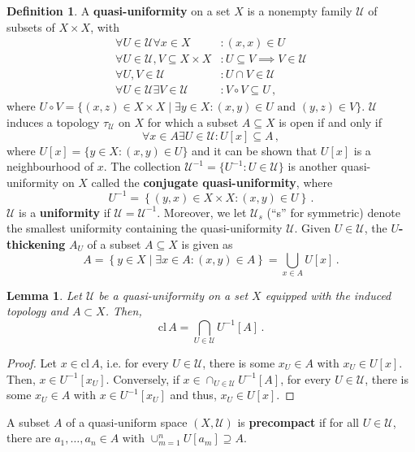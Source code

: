 \documentclass[
	paper=A4,
	pagesize=auto,
	fontsize=12pt
]{scrartcl}
\theoremstyle{plain}
\newtheorem{lemma}[theorem]{Lemma}
\theoremstyle{remark}
\theoremstyle{definition}
\newtheorem{definition}[theorem]{Definition}
\begin{document}
\begin{definition}
A \textbf{quasi-uniformity} on a set $X$ is a nonempty family $\mathcal{U}$ of subsets of $X \times X$, with
%
\begin{equation}
\begin{aligned}
\forall U \in \mathcal{U} \forall x \in X &: (x, x) \in U \\
\forall U \in \mathcal{U}, V \subseteq X \times X &: U \subseteq V \implies V \in \mathcal{U} \\
\forall U, V \in \mathcal{U} &: U \cap V \in \mathcal{U} \\
\forall U \in \mathcal{U} \exists V \in \mathcal{U} &: V \circ V \subseteq U \, ,
\end{aligned}
\end{equation}
%
where $U \circ V = \{ (x, z) \in X \times X \mid \exists y \in X : (x, y) \in U \text{ and } (y, z) \in V \}$.
$\mathcal{U}$ induces a topology $\tau_{\mathcal{U}}$ on $X$ for which a subset $A \subseteq X$ is open if and only if
%
\begin{equation}
\forall x \in A \exists U \in \mathcal{U} : U[x] \subseteq A \, ,
\end{equation}
%
where $U[x] = \{ y \in X : (x, y) \in U \}$ and it can be shown that $U[x]$ is a neighbourhood of $x$.
The collection $\mathcal{U}^{-1} = \{ U^{-1} : U \in \mathcal{U} \}$ is another quasi-uniformity on $X$ called the \textbf{conjugate quasi-uniformity}, where
%
\begin{equation}
U^{-1} = \left\{ (y, x) \in X \times X : \left( x, y \right) \in U \right\} \, .
\end{equation}
%
$\mathcal{U}$ is a \textbf{uniformity} if $\mathcal{U} = \mathcal{U}^{-1}$.
Moreover, we let $\mathcal{U}_s$ (\enquote{s} for symmetric) denote the smallest uniformity containing the quasi-uniformity $\mathcal{U}$.
Given $U \in \mathcal{U}$, the \textbf{$U$-thickening} $A_U$ of a subset $A \subseteq X$ is given as
%
\begin{equation}
A
=
\left\{ y \in X \middle| \exists x \in A : \left( x, y \right) \in A \right\}
=
\bigcup_{x \in A} U \left[ x \right] \, .
\end{equation}
\end{definition}
%
\begin{lemma}
\label{lem:ClosureAsUInveseThickening}
Let $\mathcal{U}$ be a quasi-uniformity on a set $X$ equipped with the induced topology and $A \subset X$.
Then,
%
\begin{equation}
\mathrm{cl}\, A
=
\bigcap_{U \in \mathcal{U}} U^{-1} \left[A\right] \, .
\end{equation}
\end{lemma}
\begin{proof}
Let $x \in \mathrm{cl}\, A$, i.e. for every $U \in \mathcal{U}$, there is some $x_U \in A$ with $x_U \in U[x]$.
Then, $x \in U^{-1}[x_U]$.
Conversely, if $x \in \cap_{U \in \mathcal{U}} U^{-1} [A]$, for every $U \in \mathcal{U}$, there is some $x_U \in A$ with $x \in U^{-1}[x_U]$ and thus, $x_U \in U[x]$.
\end{proof}
%
A subset $A$ of a quasi-uniform space $(X, \mathcal{U})$ is \textbf{precompact} if for all $U \in \mathcal{U}$, there are $a_1, \dots, a_n \in A$ with $\cup_{m = 1}^n U[a_m] \supseteq A$.
\end{document}
